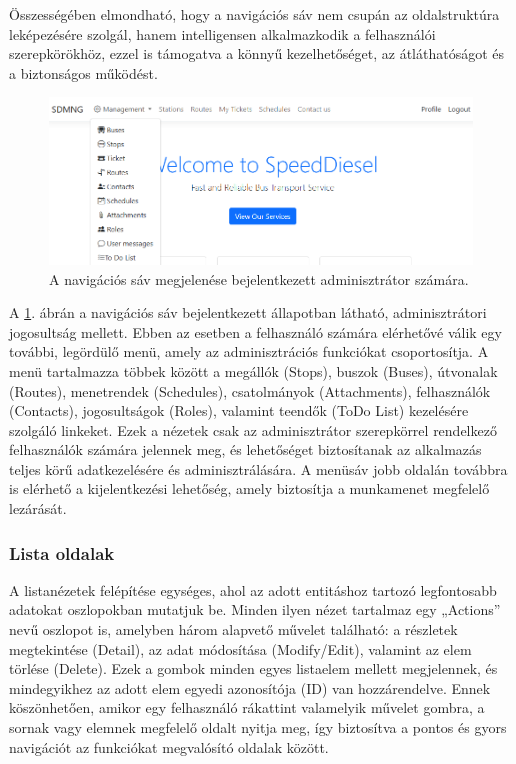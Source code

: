 Összességében elmondható, hogy a navigációs sáv nem csupán az oldalstruktúra leképezésére szolgál, hanem intelligensen alkalmazkodik a felhasználói szerepkörökhöz, ezzel is támogatva a könnyű kezelhetőséget, az átláthatóságot és a biztonságos működést.


\begin{figure}[H]
\centering
\includegraphics[width=1\textwidth]{Szakdolgozat/Mellekletek/navsavlogin1.PNG}
\caption{A navigációs sáv megjelenése bejelentkezett adminisztrátor számára.}
\label{fig:navsavlogged}
\end{figure}

A \ref{fig:navsavlogged}. ábrán a navigációs sáv bejelentkezett állapotban látható, adminisztrátori jogosultság mellett. Ebben az esetben a felhasználó számára elérhetővé válik egy további, legördülő menü, amely az adminisztrációs funkciókat csoportosítja. A menü tartalmazza többek között a megállók (Stops), buszok (Buses), útvonalak (Routes), menetrendek (Schedules), csatolmányok (Attachments), felhasználók (Contacts), jogosultságok (Roles), valamint teendők (ToDo List) kezelésére szolgáló linkeket. Ezek a nézetek csak az adminisztrátor szerepkörrel rendelkező felhasználók számára jelennek meg, és lehetőséget biztosítanak az alkalmazás teljes körű adatkezelésére és adminisztrálására. A menüsáv jobb oldalán továbbra is elérhető a kijelentkezési lehetőség, amely biztosítja a munkamenet megfelelő lezárását.

\vspace{\baselineskip}
\subsubsection{Lista oldalak}
A listanézetek felépítése egységes, ahol az adott entitáshoz tartozó legfontosabb adatokat oszlopokban mutatjuk be. Minden ilyen nézet tartalmaz egy „Actions” nevű oszlopot is, amelyben három alapvető művelet található: a részletek megtekintése (Detail), az adat módosítása (Modify/Edit), valamint az elem törlése (Delete). Ezek a gombok minden egyes listaelem mellett megjelennek, és mindegyikhez az adott elem egyedi azonosítója (ID) van hozzárendelve. Ennek köszönhetően, amikor egy felhasználó rákattint valamelyik művelet gombra, a sornak vagy elemnek megfelelő oldalt nyitja meg, így biztosítva a pontos és gyors navigációt az funkciókat megvalósító oldalak között.

